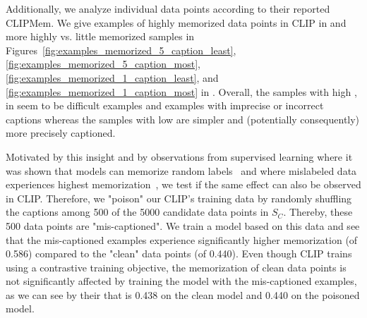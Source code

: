 Additionally, we analyze individual data points according to their reported CLIPMem.
We give examples of highly memorized data points in CLIP in  and more highly vs. little memorized samples in Figures~\ref{fig:examples_memorized_5_caption_least},\ref{fig:examples_memorized_5_caption_most},\ref{fig:examples_memorized_1_caption_least}, and \ref{fig:examples_memorized_1_caption_most}
in . 
Overall, the samples with high \ours, \eg in  seem to be difficult examples and examples with imprecise or incorrect captions whereas the samples with low \ours are simpler and (potentially consequently) more precisely captioned.

Motivated by this insight and by observations from supervised learning where it was shown that models can memorize random labels~\citep{zhang2016understanding} and where mislabeled data experiences highest memorization~\citep{feldman2020does}, we test if the same effect can also be observed in CLIP. 
Therefore, we "poison" our CLIP's training data by randomly shuffling the captions among 500 of the 5000 candidate data points in $S_C$.
Thereby, these 500 data points are "mis-captioned". We train a model based on this data and see that the mis-captioned examples experience significantly higher memorization (\ours of 0.586) compared to the "clean" data points  (\ours of 0.440). Even though CLIP trains using a contrastive training objective, the memorization of clean data points is not significantly affected by training the model with the mis-captioned examples, as we can see by their \ours that is 0.438 on the clean model and 0.440 on the poisoned model.




